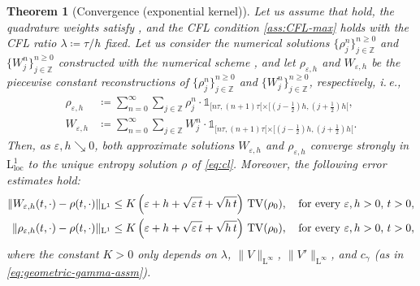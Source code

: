 \documentclass[10pt]{amsart}
\theoremstyle{plain}
\newtheorem{theorem}[lemma]{Theorem}
\theoremstyle{definition}
\numberwithin{equation}{section}
\newcommand{\eps}{{\varepsilon}}
\begin{document}
\begin{theorem}[Convergence (exponential kernel)]\label{th:main-1}
 Let us assume that  hold, the quadrature weights satisfy , and the CFL condition \cref{ass:CFL-max} holds with the CFL ratio $\lambda\coloneqq \tau/h$ fixed.
 Let us consider the numerical solutions $\{\rho_j^n\}_{j\in\mathbb{Z}}^{n\geq0}$ and $\{W_j^n\}_{j\in\mathbb{Z}}^{n\geq0}$ constructed with the numerical scheme , and let $\rho_{\eps,h}$ and $W_{\eps,h}$ be the piecewise constant reconstructions of $\{\rho_j^n\}_{j\in\mathbb{Z}}^{n\geq0}$ and $\{W_j^n\}_{j\in\mathbb{Z}}^{n\geq0}$, respectively, i.\,e., 
\begin{align*}
     \rho_{\eps,h} &\coloneqq  \sum_{n=0}^\infty \sum_{j\in\mathbb{Z}} \rho_j^n \cdot \mathds{1}_{[n\tau,(n+1)\tau[\times[(j-\frac12)h,(j+\frac12)h[}, \\
    W_{\eps,h} &\coloneqq \sum_{n=0}^\infty \sum_{j\in\mathbb{Z}} W_j^n \cdot \mathds{1}_{[n\tau,(n+1)\tau[\times[(j-\frac12)h,(j+\frac12)h[}.
\end{align*}
Then, as $\eps,h\searrow 0$, both approximate solutions $W_{\varepsilon, h}$ and $\rho_{\varepsilon, h}$ converge strongly in $\mathrm{L}^1_{\mathrm{loc}}$ to the unique entropy solution $\rho$ of \cref{eq:cl}.
Moreover, the following error estimates hold: 
\begin{align}
\|W_{\eps,h}(t,\cdot)-\rho(t,\cdot)\|_{\mathrm{L}^1} &\leq K\left( \eps+h+\sqrt{\eps\, t}+\sqrt{h\,t} \right) \, \mathrm{TV}(\rho_0), \quad \textnormal{for every } \eps,h > 0, \, t > 0, \label{eq:conv-W-exp} \\
\|\rho_{\eps,h}(t,\cdot)-\rho(t,\cdot)\|_{\mathrm{L}^1} &\leq K\left( \eps+h+\sqrt{\eps\, t}+\sqrt{h\,t} \right)\, \mathrm{TV}(\rho_0), \quad \textnormal{for every } \eps,h > 0, \, t > 0, \label{eq:conv-rho}
\end{align}
where the constant $K>0$ only depends on $\lambda$, $\|V\|_{\mathrm{L}^\infty}$, $\|V'\|_{\mathrm{L}^\infty}$, and $c_\gamma$ (as in \cref{eq:geometric-gamma-assm}).
\end{theorem}
\end{document}

